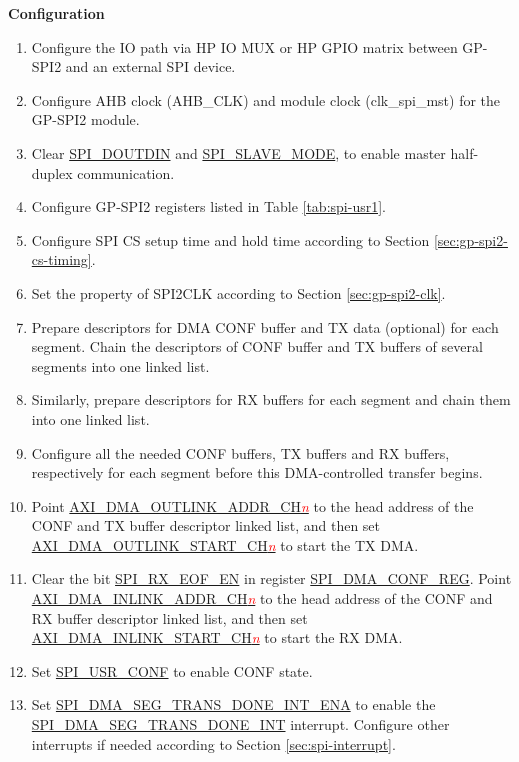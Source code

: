\documentclass[main\_\_EN.tex]{subfiles}
\begin{document}
\textbf{Configuration}

 \begin{enumerate}
    \item Configure the IO path via HP IO MUX or HP GPIO matrix between GP-SPI2 and an external SPI device.
    \item Configure AHB clock (AHB\_CLK) and module clock (clk\_spi\_mst) for the GP-SPI2 module.
    \item Clear \hyperref[fielddesc:SPIDOUTDIN]{SPI\_DOUTDIN} and \hyperref[fielddesc:SPISLAVEMODE]{SPI\_SLAVE\_MODE}, to enable master half-duplex communication.
    \item Configure GP-SPI2 registers listed in Table \ref{tab:spi-usr1}.
    \item Configure SPI CS setup time and hold time according to Section \ref{sec:gp-spi2-cs-timing}.
    \item Set the property of SPI2CLK according to Section \ref{sec:gp-spi2-clk}.
   \item Prepare descriptors for DMA CONF buffer and TX data (optional) for each segment. Chain the descriptors of CONF buffer and TX buffers of several segments into one linked list.
   \item Similarly, prepare descriptors for RX buffers for each segment and chain them into one linked list.
   \item Configure all the needed CONF buffers, TX buffers and RX buffers, respectively for each segment before this DMA-controlled transfer begins.
   \item Point \hyperref[fielddesc:AXIDMAOUTLINKADDRCHN]{AXI\_DMA\_OUTLINK\_ADDR\_CH\textcolor{red}{\it{n}}}  to the head address of the CONF and TX buffer descriptor linked list, and then set \hyperref[fielddesc:AXIDMAOUTLINKSTARTCHN]{AXI\_DMA\_OUTLINK\_START\_CH\textcolor{red}{\it{n}}}  to start the TX DMA.
   \item Clear the bit \hyperref[fielddesc:SPIRXEOFEN]{SPI\_RX\_EOF\_EN} in register \hyperref[regdesc:SPIDMACONFREG]{SPI\_DMA\_CONF\_REG}. Point \hyperref[fielddesc:AXIDMAINLINKADDRCHN]{AXI\_DMA\_INLINK\_ADDR\_CH\textcolor{red}{\it{n}}}  to the head address of the CONF and RX buffer descriptor linked list, and then set \hyperref[fielddesc:AXIDMAINLINKSTARTCHN]{AXI\_DMA\_INLINK\_START\_CH\textcolor{red}{\it{n}}}  to start the RX DMA.
   \item Set \hyperref[fielddesc:SPIUSRCONF]{SPI\_USR\_CONF} to enable CONF state.
   \item Set \hyperref[fielddesc:SPIDMASEGTRANSDONEINTENA]{SPI\_DMA\_SEG\_TRANS\_DONE\_INT\_ENA} to enable the \hyperref[int:SPIDMASEGTRANSDONEINT]{SPI\_DMA\_SEG\_TRANS\_DONE\_INT} interrupt. Configure other interrupts if needed according to Section \ref{sec:spi-interrupt}.


\end{enumerate}
\end{document}
